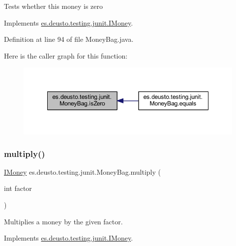 Tests whether this money is zero 

Implements \mbox{\hyperlink{interfacees_1_1deusto_1_1testing_1_1junit_1_1_i_money_a166c39b6f931e49769580a04f8c73500}{es.\+deusto.\+testing.\+junit.\+I\+Money}}.



Definition at line 94 of file Money\+Bag.\+java.

Here is the caller graph for this function\+:\nopagebreak
\begin{figure}[H]
\begin{center}
\leavevmode
\includegraphics[width=348pt]{classes_1_1deusto_1_1testing_1_1junit_1_1_money_bag_abebc5bc39c3343cb3c4e5fb291fd5893_icgraph}
\end{center}
\end{figure}
\mbox{\label{classes_1_1deusto_1_1testing_1_1junit_1_1_money_bag_aa20ce4cc70c2ba0bc9a5ccb96635d506}} 
\subsubsection{\texorpdfstring{multiply()}{multiply()}}
{\footnotesize\ttfamily \mbox{\hyperlink{interfacees_1_1deusto_1_1testing_1_1junit_1_1_i_money}{I\+Money}} es.\+deusto.\+testing.\+junit.\+Money\+Bag.\+multiply (\begin{DoxyParamCaption}\item[{int}]{factor }\end{DoxyParamCaption})}

Multiplies a money by the given factor. 

Implements \mbox{\hyperlink{interfacees_1_1deusto_1_1testing_1_1junit_1_1_i_money_a09154f9713133d4734f72d6a20081209}{es.\+deusto.\+testing.\+junit.\+I\+Money}}.



